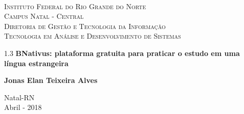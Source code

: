 
\begin{titlepage}
	\begin{center}
		
		  
		\begin{minipage}{11.15cm}
			\begin{center}
				\begin{espacosimples}
					{\small \ \\
                       \textsc{Instituto Federal do Rio Grande do Norte}
                       \\
							  \textsc{Campus Natal - Central}					\\
							  \textsc{Diretoria de Gestão e Tecnologia da Informação}	   
							  \\
							  \textsc{Tecnologia em Análise e Desenvolvimento de Sistemas}}   	
                       \\
				\end{espacosimples}
			\end{center}
		\end{minipage}

			
		\vspace{6cm}
						
		{\setlength{\baselineskip}%
		{1.3\baselineskip}
		{\LARGE \textbf{BNativus: plataforma gratuita para praticar o estudo em uma língua estrangeira}}\par}
			
		\vspace{3cm}
			
		{\large \textbf{Jonas Elan Teixeira Alves}}
						
		\vspace{6cm}
		
		Natal-RN\\Abril - 2018
	\end{center}
\end{titlepage}